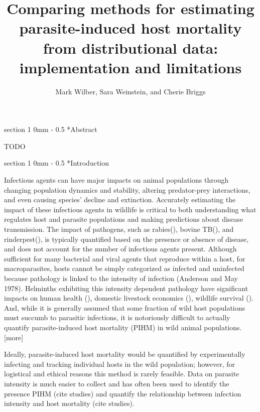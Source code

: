 \documentclass[12pt, a4paper]{article}
\title{Comparing methods for estimating parasite-induced host mortality from distributional data: implementation and limitations}
\author{Mark Wilber, Sara Weinstein, and Cherie Briggs}
\makeatletter
\renewcommand{\section}{\@startsection
{section}%
{1}%
{0mm}%
{-\baselineskip}%
{0.5\baselineskip}%
{\normalfont\bf\large}} %
\makeatother
\begin{document}
\maketitle

\section*{Abstract}

TODO

\doublespacing

\linenumbers
\section*{Introduction}

Infectious agents can have major impacts on animal populations through changing
population dynamics and stability, altering predator-prey interactions, and
even causing species’ decline and extinction. Accurately estimating the impact
of these infectious agents in wildlife is critical to both understanding what
regulates host and parasite populations and making predictions about disease
transmission. The impact of pathogens, such as rabies(), bovine TB(), and
rinderpest(),  is typically quantified based on the presence or absence of
disease, and does not account for the number of infectious agents present.
Although sufficient for many bacterial and viral agents that reproduce within a
host, for macroparasites, hosts cannot be simply categorized as infected and
uninfected because pathology is linked to the intensity of infection (Anderson
and May 1978).  Helminths exhibiting this intensity dependent pathology have
significant impacts on human health (), domestic livestock economics (),
wildlife survival ().  And, while it is generally assumed that some fraction of
wild host populations must succumb to parasitic infections, it is notoriously
difficult to actually quantify parasite-induced host mortality (PIHM) in wild
animal populations. [more]

Ideally, parasite-induced host mortality would be
quantified by experimentally infecting and tracking individual hosts in the
wild population; however, for logistical and ethical reasons this method is
rarely feasible. Data on parasite intensity is much easier to collect and has
often been used to identify the presence PIHM (cite studies) and quantify the
relationship between infection intensity and host mortality (cite studies).
\end{document}
